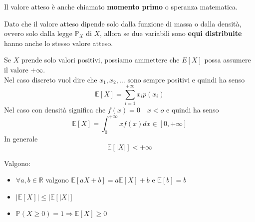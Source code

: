 \begin{note}
	Il valore atteso è anche chiamato \textbf{momento primo} o speranza matematica.
\end{note}

\begin{observation}
	Dato che il valore atteso dipende solo dalla funzione di massa o dalla densità, ovvero solo dalla legge $\mathbb{P}_X$ di $X$, allora se due variabili sono \textbf{equi distribuite} hanno anche lo stesso valore atteso.
\end{observation}

\begin{observation}
	Se $X$ prende solo valori positivi, possiamo ammettere che $E[X]$ possa assumere il valore $+\infty$.\\
	Nel caso discreto vuol dire che $x_1, x_2, \ldots$ sono sempre positivi e quindi ha senso
	\begin{equation*}
		\mathbb{E}[X]=\sum_{i=1}^{+\infty} x_i p(x_i)
	\end{equation*}
	Nel caso con densità significa che $f(x)=0 \quad x<o$ e quindi ha senso
	\begin{equation*}
		\mathbb{E}[X] = \int_{0}^{+\infty} xf(x)dx \in [0, +\infty]
	\end{equation*}
	In generale
	\begin{equation}
		\mathbb{E}[\lvert X \rvert] < + \infty
	\end{equation}
\end{observation}

\begin{proposition}
	Valgono:
	\begin{itemize}
		\item $\forall a,b \in \mathbb{R}$ valgono $\mathbb{E}[aX+b]=a\mathbb{E}[X] + b$ e $\mathbb{E}[b] = b$
		\item $\lvert \mathbb{E}[X]\rvert \leq \lvert \mathbb{E}[\lvert X \rvert]$
		\item $\mathbb{P}(X \geq 0)=1 \Longrightarrow \mathbb{E}[X] \geq 0$
	\end{itemize}
\end{proposition}

